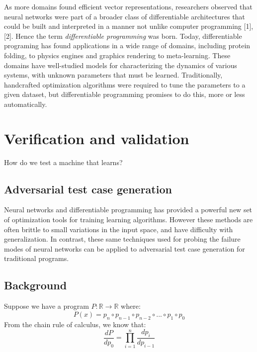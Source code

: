 \documentclass[12pt,initial,twoside,maitrise]{dms}
\numberwithin{equation}{section}
\numberwithin{table}{chapter}
\numberwithin{figure}{chapter}
\begin{document}
As more domains found efficient vector representations, researchers observed that neural networks were part of a broader class of differentiable architectures that could be built and interpreted in a manner not unlike computer programming [1], [2]. Hence the term \textit{differentiable programming} was born. Today, differentiable programing has found applications in a wide range of domains, including protein folding\cite{alquraishi2018end}, to physics engines\cite{de2018end} and graphics rendering\cite{loper2014opendr} to meta-learning\cite{liu2018darts}. These domains have well-studied models for characterizing the dynamics of various systems, with unknown parameters that must be learned. Traditionally, handcrafted optimization algorithms were required to tune the parameters to a given dataset, but differentiable programming promises to do this, more or less automatically.

\chapter{Verification and validation}\label{ch:difftest}

How do we test a machine that learns?

\section{Adversarial test case generation}

Neural networks and differentiable programming has provided a powerful new set of optimization tools for training learning algorithms. However these methods are often brittle to small variations in the input space, and have difficulty with generalization. In contrast, these same techniques used for probing the failure modes of neural networks can be applied to adversarial test case generation for traditional programs.

\section{Background}

Suppose we have a program $P: \mathbb{R}\rightarrow\mathbb{R}$ where:
%
\begin{equation}
    P(x)=p_n \circ p_{n-1} \circ p_{n-2} \circ ... \circ p_1 \circ p_0
\end{equation}
%
From the chain rule of calculus, we know that:
%
\begin{equation}
    \frac{dP}{dp_0} = {\displaystyle \prod_{i=1}^{n} \frac{dp_{i}}{dp_{i-1}}}
\end{equation}
\end{document}
